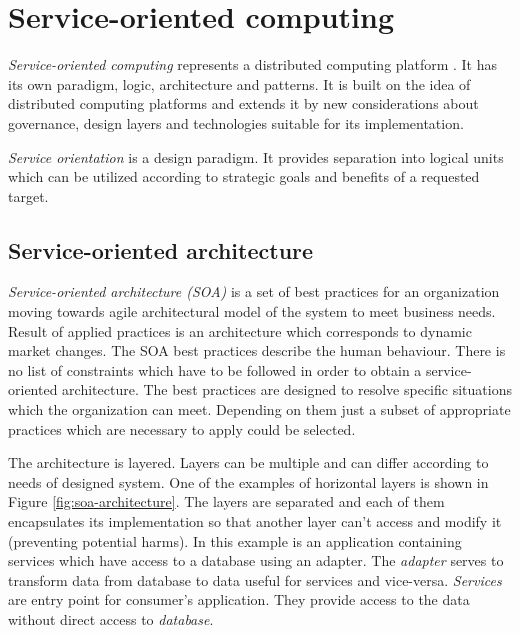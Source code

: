 \chapter{Service-oriented computing}
\label{chap:service-oriented computing}
\emph{Service-oriented computing} represents a distributed computing platform \cite{soa-contract}. It has its own paradigm, logic, architecture and patterns. It is built on the idea of distributed computing platforms and extends it by new considerations about governance, design layers and technologies suitable for its implementation.


\emph{Service orientation} is a design paradigm. It provides separation into logical units which can be utilized according to strategic goals and benefits of a requested target.

\section{Service-oriented architecture}
\emph{Service-oriented architecture (SOA)} is a set of best practices for an organization moving towards \gls{agile} architectural model of the system to meet business needs. Result of applied practices is an architecture which corresponds to dynamic market changes. The SOA best practices describe the human behaviour. There is no list of constraints which have to be followed in order to obtain a service-oriented architecture. The best practices are designed to resolve specific situations which the organization can meet. Depending on them just a subset of appropriate practices which are necessary to apply could be selected.\par

The architecture is layered. Layers can be multiple and can differ according to needs of designed system. One of the examples of horizontal layers is shown in Figure \ref{fig:soa-architecture}. The layers are separated and each of them encapsulates its implementation so that another layer can't access and modify it (preventing potential harms). In this example is an application containing services which have access to a database using an adapter. The \textit{\gls{adapter}} serves to transform data from database to data useful for services and vice-versa. \textit{Services} are entry point for consumer's application. They provide access to the data without direct access to \textit{database}.

